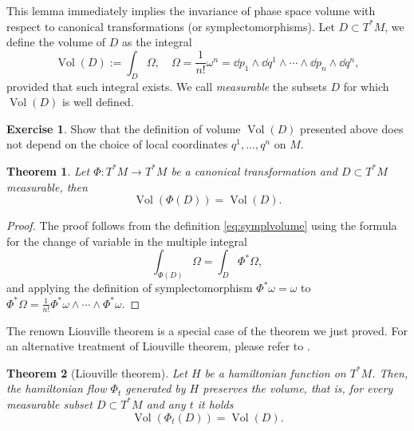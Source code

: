 \documentclass[english,fontsize=11pt,paper=b5]{scrbook}
\DeclareMathOperator{\Vol}{Vol}
\DeclareMathOperator{\Vol}{Vol}
\newtheorem{theorem}{Theorem}[chapter]
\theoremstyle{definition}
\newtheorem{exercise}{Exercise}[chapter]
\begin{document}
    This lemma immediately implies the invariance of phase space volume with respect to canonical transformations (or symplectomorphisms).
    Let $D\subset T^*M$, we define the volume of $D$ as the integral
    \begin{equation}\label{eq:symplvolume}
      \Vol(D) :=\int_D \Omega, \quad \Omega = \frac1{n!} \omega^n = \dd p_1 \wedge \dd q^1 \wedge \cdots \wedge \dd p_n \wedge \dd q^n,
    \end{equation}
    provided that such integral exists.
    We call \emph{measurable} the subsets $D$ for which $\Vol(D)$ is well defined.

    \begin{exercise}
      Show that the definition of volume $\Vol(D)$ presented above does not depend on the choice of local coordinates $q^1, \ldots, q^n$ on $M$.
    \end{exercise}

    \begin{theorem}\label{thm:liouville}
      Let $\Phi:T^*M \to T^*M$ be a canonical transformation and $D\subset T^*M$ measurable, then
      \begin{equation}
        \Vol(\Phi(D)) = \Vol(D).
      \end{equation}
    \end{theorem}
    \begin{proof}
      The proof follows from the definition \eqref{eq:symplvolume} using the formula for the change of variable in the multiple integral
      \begin{equation}
        \int_{\Phi(D)}\Omega = \int_D \Phi^*\Omega,
      \end{equation}
      and applying the definition of symplectomorphism $\Phi^* \omega = \omega$ to $\Phi^* \Omega = \frac1{n!}\Phi^*\omega\wedge\cdots\wedge\Phi^*\omega$.
    \end{proof}

    The renown Liouville theorem is a special case of the theorem we just proved.
    For an alternative treatment of Liouville theorem, please refer to \cite[Chapter 3.16]{book:arnold}.

    \begin{theorem}[Liouville theorem]
      Let $H$ be a hamiltonian function on $T^*M$.
      Then, the hamiltonian flow $\Phi_t$ generated by $H$ preserves the volume, that is, for every measurable subset $D\subset T^*M$ and any $t$ it holds
      \begin{equation}
        \Vol(\Phi_t(D)) = \Vol(D).
      \end{equation}
    \end{theorem}
\end{document}
